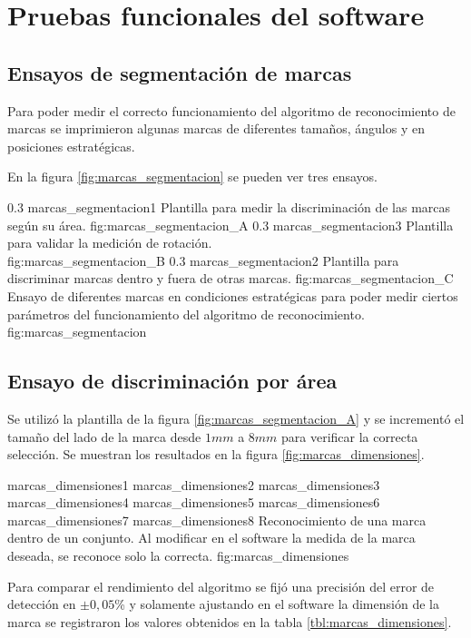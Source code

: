\section{Pruebas funcionales del software}
\label{sec:pruebasHW}

\subsection{Ensayos de segmentación de marcas}
Para poder medir el correcto funcionamiento del algoritmo de reconocimiento de marcas se imprimieron algunas marcas de diferentes tamaños, ángulos y en posiciones estratégicas.\par
En la figura \ref{fig:marcas_segmentacion} se pueden ver tres ensayos.

   \subfigabc
   {0.3} {marcas_segmentacion1} {Plantilla para medir la discriminación de las marcas según su área.} {fig:marcas_segmentacion_A}
   {0.3} {marcas_segmentacion3} {Plantilla para validar la medición de rotación.\\ \vphantom{1}} {fig:marcas_segmentacion_B}
   {0.3} {marcas_segmentacion2} {Plantilla para discriminar marcas dentro y fuera de otras marcas.} {fig:marcas_segmentacion_C}
   {Ensayo de diferentes marcas en condiciones estratégicas para poder medir ciertos parámetros del funcionamiento del algoritmo de reconocimiento.}
   {fig:marcas_segmentacion}

\subsection{Ensayo de discriminación por área}

Se utilizó la plantilla de la figura \ref{fig:marcas_segmentacion_A} y se incrementó el tamaño del lado de la marca desde $1mm$ a $8mm$ para verificar la correcta selección. Se muestran los resultados en la figura \ref{fig:marcas_dimensiones}.

\subfigfourfour
   {marcas_dimensiones1}
   {marcas_dimensiones2}
   {marcas_dimensiones3}
   {marcas_dimensiones4}
   {marcas_dimensiones5}
   {marcas_dimensiones6}
   {marcas_dimensiones7}
   {marcas_dimensiones8}
   {Reconocimiento de una marca dentro de un conjunto. Al modificar en el software la medida de la marca deseada, se reconoce solo la correcta.}
   {fig:marcas_dimensiones}

   Para comparar el rendimiento del algoritmo se fijó una precisión del error de detección en $\pm0,05$\% y solamente ajustando en el software la dimensión de la marca se registraron los valores obtenidos en la tabla \ref{tbl:marcas_dimensiones}.\par

